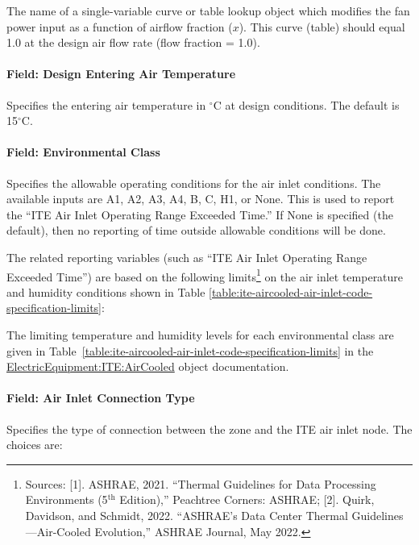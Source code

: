 The name of a single-variable curve or table lookup object which modifies the fan power input as a function of airflow fraction ($x$). This curve (table) should equal 1.0 at the design air flow rate (flow fraction = 1.0).

\paragraph{Field: Design Entering Air Temperature}\label{field-design-entering-air-temperature-ite-definition}

Specifies the entering air temperature in $^\circ$C at design conditions. The default is 15$^\circ$C.

\paragraph{Field: Environmental Class}\label{field-environmental-class-ite-definition}

Specifies the allowable operating conditions for the air inlet conditions. The available inputs are A1, A2, A3, A4, B, C, H1, or None. This is used to report the ``ITE Air Inlet Operating Range Exceeded Time.'' If None is specified (the default), then no reporting of time outside allowable conditions will be done.

The related reporting variables (such as ``ITE Air Inlet Operating Range Exceeded Time'') are based on the following limits\footnote{Sources: [1]. ASHRAE, 2021. ``Thermal Guidelines for Data Processing Environments (5$^{\textrm{th}}$ Edition),'' Peachtree Corners: ASHRAE; [2]. Quirk, Davidson, and Schmidt, 2022. ``ASHRAE's Data Center Thermal Guidelines---Air-Cooled Evolution,'' ASHRAE Journal, May 2022.} on the air inlet temperature and humidity conditions shown in Table \ref{table:ite-aircooled-air-inlet-code-specification-limits}:

The limiting temperature and humidity levels for each environmental class are given in Table~\ref{table:ite-aircooled-air-inlet-code-specification-limits} in the \hyperref[electricequipmentiteaircooled]{ElectricEquipment:ITE:AirCooled} object documentation.

\paragraph{Field: Air Inlet Connection Type}\label{field-air-inlet-connection-type-ite-definition}

Specifies the type of connection between the zone and the ITE air inlet node. The choices are:

